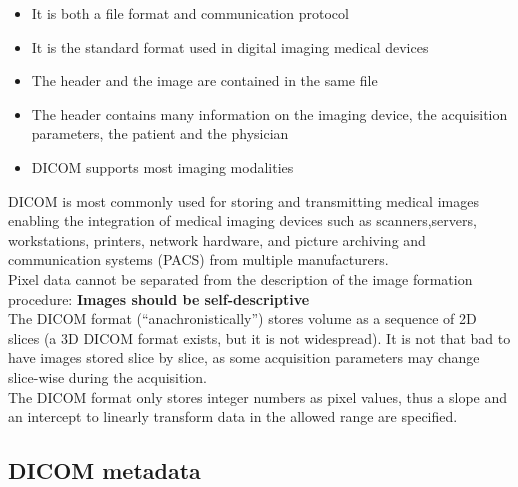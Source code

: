 \begin{tcolorbox}[width=\textwidth,colback={white},title={\textbf{Di}gital Imaging and \textbf{CO}mmunication in \textbf{M}edicine (\textbf{DICOM}): },colbacktitle=cyan,coltitle=black]
	\begin{itemize}
		\item It is both a file format and communication protocol
		\item It is the standard format used in digital imaging medical devices
		\item The header and the image are contained in the same file
		\item The header contains many information on the imaging device, the acquisition parameters, the patient and the physician\\
		
		\item DICOM supports most imaging modalities
	\end{itemize}
\end{tcolorbox}

DICOM is most commonly used for storing and transmitting medical images enabling the integration of medical imaging devices such as scanners,servers, workstations, printers, network hardware, and picture archiving and communication systems (PACS) from multiple manufacturers.\\

Pixel data cannot be separated from the description of the image formation procedure: \textbf{Images should be self-descriptive}\\

The DICOM format (“anachronistically”) stores volume as a sequence of 2D slices (a 3D DICOM format exists, but it is not widespread). It is not that bad to have images stored slice by slice, as some acquisition parameters may change slice-wise during the acquisition.\\

The DICOM format only stores integer numbers as pixel values, thus a slope and an intercept to linearly transform data in the allowed range are specified.

\newpage
\subsection{DICOM metadata}

